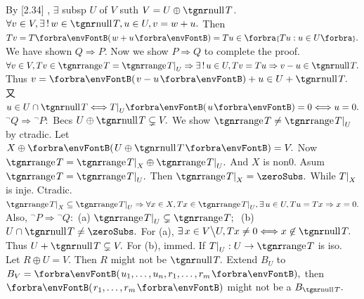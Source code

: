 By [2.34] , $\exists$ subsp $U$ of $V$ suth $V=U\oplus\null T$.\parSol{}
$\forall v\in V,\exists\,!\,w\in\null T,u\in U, v=w+u.$ Then $Tv=T\Par{w+u}=Tu\in\Bra{Tu:u\in U}.$\PfEnd\vspace{6pt}
\vspace{2pt}\parCor
We have shown $Q\Rightarrow P.$ Now we show $P\Rightarrow Q$ to complete the proof.\parCor
$\forall v\in V,Tv\in\range T=\range T\mmid_U\Rightarrow \exists\,!\,u\in U,Tv=Tu\Rightarrow v-u\in\null T.$\parCor Thus $v=\Par{v-u}+u\in U+\null T.$ 又 $u\in U\cap\null T\Longleftrightarrow T\mmid_U\Par{u}=0\Longleftrightarrow u=0.$\PfEnd\vspace{4pt}\parCor
\Or ${}^\neg Q\Rightarrow{}^\neg P:$ \;Becs $U\oplus\null T\subsetneq V.$ We show $\range T\neq\range T\mmid_U$ by ctradic.\parCor
Let $X\oplus\Par{U\oplus\null T}=V.$ Now $\range T=\range T\mmid_X\oplus\range T\mmid_U.$ And $X$ is non0.\parCor
Asum $\range T=\range T\mmid_U.$ Then $\range T\mmid_X=\zeroSubs.$ While $T\text{\normalsize|}_X$ is inje. Ctradic.\parCor
\Or $\range T\mmid_X\subseteq\range T\mmid_U\Rightarrow \forall x\in X,Tx\in\range T\mmid_U,\exists\,u\in U,Tu=Tx\Rightarrow x=0.$\vspace{4pt}\parCor
Also, ${}^\neg P\Rightarrow{}^\neg Q:$ \;(a) $\range T\mmid_U\subsetneq\range T;\;$ {\OR} (b) $U\cap\null T\neq\zeroSubs.$\parCor
For (a), $\exists\,x\in V\Backslash U,Tx\neq 0\Longleftrightarrow x\not\in\null T.$ Thus $U+\null T\subsetneq V.$ For (b), immed.\PfEnd\vspace{4pt}
\AComm If $T\mmid_U:U\rightarrow\range T$ is iso. Let $R\oplus U=V.$ Then $R$ might not be $\null T.$\parCom
\Or Extend $B_U$ to $B_V=\Par{u_1,\dots,u_n,r_1,\dots,r_m},$ then $\Par{r_1,\dots,r_m}$ might not be a $B_{\null T}.$\vspace{-2pt}
\SepLine


